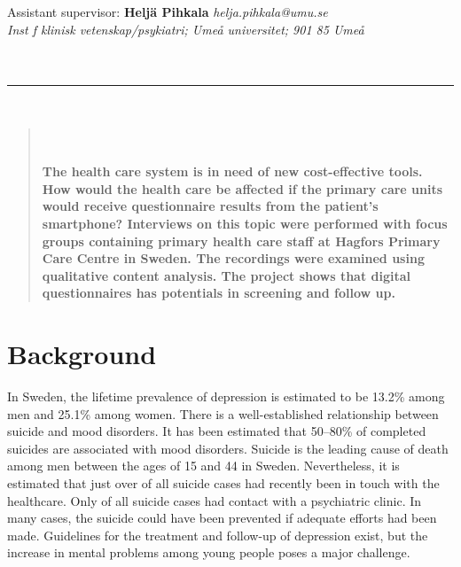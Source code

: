 \documentclass[12pt,a4paper,oneside]{article}
\let\oldcite\cite
\renewcommand*\cite[1]{\textsuperscript{\oldcite{#1}}}
\begin{document}
 {\small Assistant supervisor:} {\small \bf Helj{\"a} Pihkala} {\small \it helja.pihkala@umu.se}\\
 {\small\it Inst f klinisk vetenskap/psykiatri; Ume\r{a} universitet; 901 85 Ume\r{a}}\vspace{.5cm}\\
{\\}\\
\hrule
\ \\
\selectfont

\begin{abstract}
\ \\\vspace{-2em}\ \\
\bfseries{
The health care system is in need of new cost-effective tools. How would the health care be affected if the primary care units would receive questionnaire results from the patient's smartphone? Interviews on this topic were performed with focus groups containing primary health care staff at Hagfors Primary Care Centre in Sweden. The recordings were examined using qualitative content analysis. The project shows that digital questionnaires has potentials in screening and follow up.
}
\end{abstract}

\section*{Background}
In Sweden, the lifetime prevalence of depression is estimated to be 13.2\% among men and 25.1\% among women\cite{numbers0}. There is a well-established relationship between suicide and mood disorders\cite{numbers1.1}. It has been estimated that 50--80\% of completed suicides are associated with mood disorders\cite{numbers1.1}. Suicide is the leading cause of death among men between the ages of 15 and 44 in Sweden\cite{numbers3.0.1}. Nevertheless, it is estimated that just over  of all suicide cases had recently been in touch with the healthcare. Only  of all suicide cases had contact with a psychiatric clinic\cite{numbers2}. In many cases, the suicide could have been prevented if adequate efforts had been made\cite{numbers1}. Guidelines for the treatment and follow-up of depression exist, but the increase in mental problems among young people poses a major challenge\cite{guide1, regionjh1}.
\end{document}
